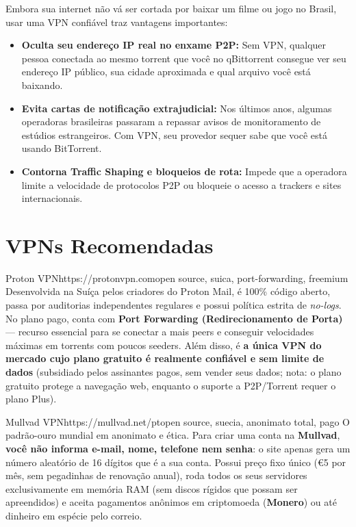 \documentclass{pousadaguide}
\begin{document}
\begin{nota}
Embora sua internet não vá ser cortada por baixar um filme ou jogo no Brasil, usar uma VPN confiável traz vantagens importantes:
\begin{itemize}
  \item \textbf{Oculta seu endereço IP real no enxame P2P:} Sem VPN, qualquer pessoa conectada ao mesmo torrent que você no qBittorrent consegue ver seu endereço IP público, sua cidade aproximada e qual arquivo você está baixando.
  \item \textbf{Evita cartas de notificação extrajudicial:} Nos últimos anos, algumas operadoras brasileiras passaram a repassar avisos de monitoramento de estúdios estrangeiros. Com VPN, seu provedor sequer sabe que você está usando BitTorrent.
  \item \textbf{Contorna Traffic Shaping e bloqueios de rota:} Impede que a operadora limite a velocidade de protocolos P2P ou bloqueie o acesso a trackers e sites internacionais.
\end{itemize}
\end{nota}

\section{VPNs Recomendadas}

\begin{ferramenta}[goat,logo=proton]{Proton VPN}{https://protonvpn.com}{open source, suica, port-forwarding, freemium}
Desenvolvida na Suíça pelos criadores do Proton Mail, é 100\% código aberto, passa por auditorias independentes regulares e possui política estrita de \emph{no-logs}. No plano pago, conta com \textbf{Port Forwarding (Redirecionamento de Porta)} — recurso essencial para se conectar a mais peers e conseguir velocidades máximas em torrents com poucos seeders. Além disso, é \textbf{a única VPN do mercado cujo plano gratuito é realmente confiável e sem limite de dados} (subsidiado pelos assinantes pagos, sem vender seus dados; nota: o plano gratuito protege a navegação web, enquanto o suporte a P2P/Torrent requer o plano Plus). 
\end{ferramenta}

\begin{ferramenta}[goat,logo=mullvad]{Mullvad VPN}{https://mullvad.net/pt}{open source, suecia, anonimato total, pago}
O padrão-ouro mundial em anonimato e ética. Para criar uma conta na \textbf{Mullvad}, \textbf{você não informa e-mail, nome, telefone nem senha}: o site apenas gera um número aleatório de 16 dígitos que é a sua conta. Possui preço fixo único (€5 por mês, sem pegadinhas de renovação anual), roda todos os seus servidores exclusivamente em memória RAM (sem discos rígidos que possam ser apreendidos) e aceita pagamentos anônimos em criptomoeda (\textbf{Monero}) ou até dinheiro em espécie pelo correio. 
\end{ferramenta}
\end{document}
